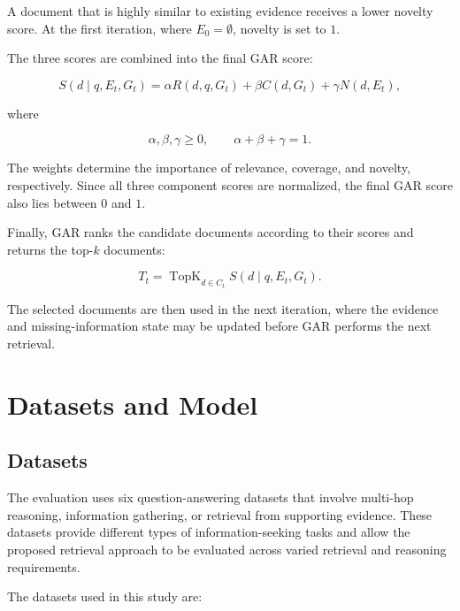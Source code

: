 \documentclass[12pt,a4paper]{report}
\begin{document}
A document that is highly similar to existing evidence receives a lower novelty score. At the first iteration, where $E_0=\emptyset$, novelty is set to $1$.

The three scores are combined into the final GAR score:

\[
S(d\mid q,E_t,G_t)
=
\alpha R(d,q,G_t)
+
\beta C(d,G_t)
+
\gamma N(d,E_t),
\]

where

\[
\alpha,\beta,\gamma\geq0,
\qquad
\alpha+\beta+\gamma=1.
\]

The weights determine the importance of relevance, coverage, and novelty, respectively. Since all three component scores are normalized, the final GAR score also lies between $0$ and $1$.

Finally, GAR ranks the candidate documents according to their scores and returns the top-$k$ documents:

\[
T_t=
\operatorname{TopK}_{d\in C_t}
S(d\mid q,E_t,G_t).
\]

The selected documents are then used in the next iteration, where the evidence and missing-information state may be updated before GAR performs the next retrieval.
\clearpage
\section{Datasets and Model}

\subsection{Datasets}

The evaluation uses six question-answering datasets that involve multi-hop reasoning, information gathering, or retrieval from supporting evidence. These datasets provide different types of information-seeking tasks and allow the proposed retrieval approach to be evaluated across varied retrieval and reasoning requirements.

The datasets used in this study are:
\end{document}
